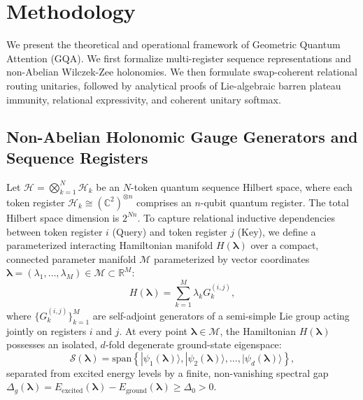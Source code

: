 \documentclass{article}
\begin{document}
\section{Methodology}
\label{sec:methodology}

We present the theoretical and operational framework of Geometric Quantum Attention (GQA). We first formalize multi-register sequence representations and non-Abelian Wilczek-Zee holonomies. We then formulate swap-coherent relational routing unitaries, followed by analytical proofs of Lie-algebraic barren plateau immunity, relational expressivity, and coherent unitary softmax.

\subsection{Non-Abelian Holonomic Gauge Generators and Sequence Registers}
\label{sec:holonomic_generators}

Let $\mathcal{H} = \bigotimes_{k=1}^N \mathcal{H}_k$ be an $N$-token quantum sequence Hilbert space, where each token register $\mathcal{H}_k \cong (\mathbb{C}^2)^{\otimes n}$ comprises an $n$-qubit quantum register. The total Hilbert space dimension is $2^{Nn}$. To capture relational inductive dependencies between token register $i$ (Query) and token register $j$ (Key), we define a parameterized interacting Hamiltonian manifold $H(\boldsymbol{\lambda})$ over a compact, connected parameter manifold $\mathcal{M}$ parameterized by vector coordinates $\boldsymbol{\lambda} = (\lambda_1, \dots, \lambda_M) \in \mathcal{M} \subset \mathbb{R}^M$:
\begin{equation}
H(\boldsymbol{\lambda}) = \sum_{k=1}^M \lambda_k G_k^{(i, j)},
\label{eq:hamiltonian_manifold}
\end{equation}
where $\{G_k^{(i, j)}\}_{k=1}^M$ are self-adjoint generators of a semi-simple Lie group acting jointly on registers $i$ and $j$. At every point $\boldsymbol{\lambda} \in \mathcal{M}$, the Hamiltonian $H(\boldsymbol{\lambda})$ possesses an isolated, $d$-fold degenerate ground-state eigenspace:
\begin{equation}
\mathcal{S}(\boldsymbol{\lambda}) = \mathrm{span}\left\{ |\psi_1(\boldsymbol{\lambda})\rangle, |\psi_2(\boldsymbol{\lambda})\rangle, \dots, |\psi_d(\boldsymbol{\lambda})\rangle \right\},
\label{eq:degenerate_subspace}
\end{equation}
separated from excited energy levels by a finite, non-vanishing spectral gap $\Delta_g(\boldsymbol{\lambda}) = E_{\mathrm{excited}}(\boldsymbol{\lambda}) - E_{\mathrm{ground}}(\boldsymbol{\lambda}) \ge \Delta_0 > 0$.
\end{document}

